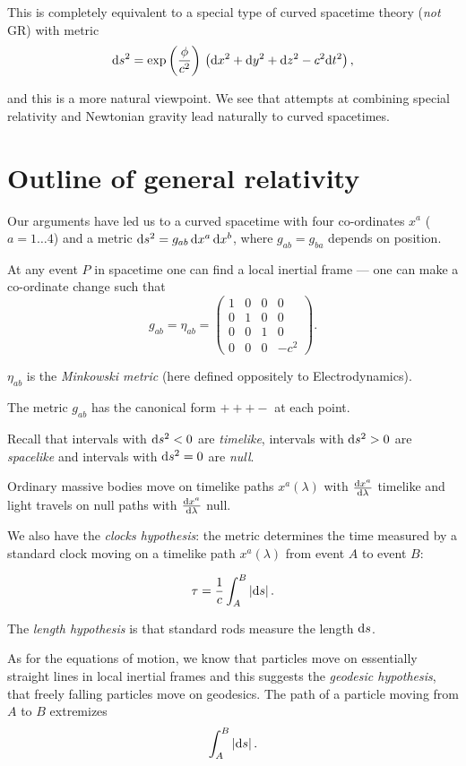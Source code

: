 \documentclass{notes}
\begin{document}
This is completely equivalent to a special type of curved spacetime
theory (\emph{not} GR) with metric
\[
\mathrm{d} s^2 = \exp \left(\frac{\phi}{c^2}\right)\, \left(\mathrm{d} x^2 + \mathrm{d} y^2 +
\mathrm{d} z^2 - c^2 \mathrm{d} t^2\right),
\]

and this is a more natural viewpoint.  We see that attempts at
combining special relativity and Newtonian gravity lead naturally
to curved spacetimes.

\section{Outline of general relativity}

Our arguments have led us to a curved spacetime with four
co-ordinates $x^a$ ($a = 1 \dots 4$) and a metric
$\mathrm{d} s^2 = g_{a b}\, \mathrm{d} x^a\, \mathrm{d} x^b$, where
$g_{a b} = g_{b a}$ depends on position.

At any event $P$ in spacetime one can find a local inertial frame ---
one can make a co-ordinate change such that
\[
g_{a b} = \eta_{a b}
= \begin{pmatrix}
1 & 0 & 0 & 0 \\
0 & 1 & 0 & 0 \\
0 & 0 & 1 & 0 \\
0 & 0 & 0 & -c^2
\end{pmatrix}.
\]

$\eta_{a b}$ is the \emph{Minkowski metric} (here defined oppositely
to Electrodynamics).

The metric $g_{a b}$ has the canonical form $+ + + -$ at each point.

Recall that intervals with $\mathrm{d} s^2 < 0$ are \emph{timelike},
intervals with $\mathrm{d} s^2 > 0$ are \emph{spacelike} and intervals with
$\mathrm{d} s^2 = 0$ are \emph{null}.

Ordinary massive bodies move on timelike paths $x^a(\lambda)$ with
$\frac{\mathrm{d} x^a}{\mathrm{d}\lambda}$ timelike and light travels on null paths
with $\frac{\mathrm{d} x^a}{\mathrm{d}\lambda}$ null.

We also have the \emph{clocks hypothesis}: the metric determines
the time measured by a standard clock moving on a timelike path
$x^a(\lambda)$ from event $A$ to event $B$:

\[
\tau = \frac{1}{c} \int_A^B \left|\mathrm{d} s\right|.
\]

The \emph{length hypothesis} is that standard rods measure the length
$\mathrm{d} s$.

As for the equations of motion, we know that particles move on essentially
straight lines in local inertial frames and this suggests the \emph{geodesic
hypothesis}, that freely falling particles move on geodesics.  The
path of a particle moving from $A$ to $B$ extremizes
\[
\int_A^B \left|\mathrm{d} s\right|.
\]
\end{document}

